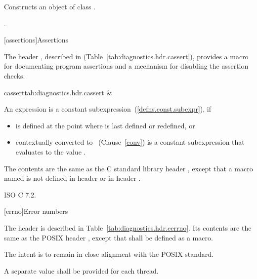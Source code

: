 \begin{itemdescr}
\pnum
\effects
Constructs an object of class
.

\pnum
\postcondition
{}.
\end{itemdescr}

[assertions]{Assertions}

\pnum
The header
, described in
(Table~\ref{tab:diagnostics.hdr.cassert}),
provides a macro for documenting \Cpp program assertions and a mechanism
for disabling the assertion checks.

\begin{libsyntab2}{cassert}{tab:diagnostics.hdr.cassert}
\macro  &     \\
\end{libsyntab2}

\pnum
An expression 
is a constant subexpression~(\ref{defns.const.subexpr}), if
\begin{itemize}
\item
{} is defined at the point where 
is last defined or redefined, or
\item
{} contextually converted to ~(Clause~\ref{conv})
is a constant subexpression that evaluates to the value .
\end{itemize}

\pnum
{}%
The contents are the same as the C standard library header
,
except that a macro named 
is not defined in header 
or in header .

\xref
ISO C 7.2.

[errno]{Error numbers}

\pnum
The header  is described in Table~\ref{tab:diagnostics.hdr.cerrno}. Its contents are the same as the POSIX header , except that  shall be defined as a macro. \begin{note} The intent is to remain in close alignment with the POSIX standard. \end{note} A separate  value shall be provided for each thread.


